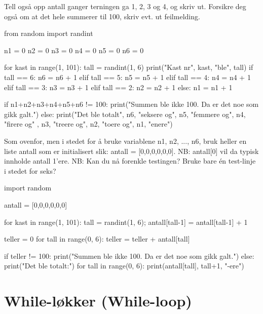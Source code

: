 \begin{exercise}
Tell også opp antall ganger terningen ga 1, 2, 3 og 4, og skriv ut. Forsikre deg også om at det hele summerer til 100, skriv evt. ut feilmelding.
\end{exercise}
\begin{solution}
\begin{usncodebox}
from random import randint

n1 = 0
n2 = 0
n3 = 0
n4 = 0
n5 = 0
n6 = 0

for kast in range(1, 101):
    tall = randint(1, 6)
    print("Kast nr", kast, "ble", tall)
    if tall == 6:
        n6 = n6 + 1
    elif tall == 5:
        n5 = n5 + 1
    elif tall == 4:
        n4 = n4 + 1
    elif tall == 3:
        n3 = n3 + 1
    elif tall == 2:
        n2 = n2 + 1
    else:
        n1 = n1 + 1

if n1+n2+n3+n4+n5+n6 != 100:
    print("Summen ble ikke 100. Da er det noe som gikk galt.")
else:
    print("Det ble totalt", n6, "seksere og", n5, "femmere og", n4, "firere og"
      , n3, "treere og", n2, "toere og", n1, "enere")
\end{usncodebox}
\end{solution}

\begin{exercise}
Som ovenfor, men i stedet for å bruke variablene n1, n2, ..., n6, bruk heller en liste antall som er initialisert slik: antall = [0,0,0,0,0,0]. NB: antall[0] vil da typisk innholde antall 1'ere. NB: Kan du nå forenkle testingen? Bruke bare én test-linje i stedet for seks? 
\end{exercise}
\begin{solution}
\begin{usncodebox}
import random

antall = [0,0,0,0,0,0]

for kast in range(1, 101):
    tall = randint(1, 6);
    antall[tall-1] = antall[tall-1] + 1

teller = 0
for tall in range(0, 6):
    teller = teller + antall[tall]

if teller != 100:
    print("Summen ble ikke 100. Da er det noe som gikk galt.")
else:
    print("Det ble totalt:")
    for tall in range(0, 6):
        print(antall[tall], tall+1, "-ere")
\end{usncodebox}
\end{solution}

\section{While-løkker (While-loop)}

